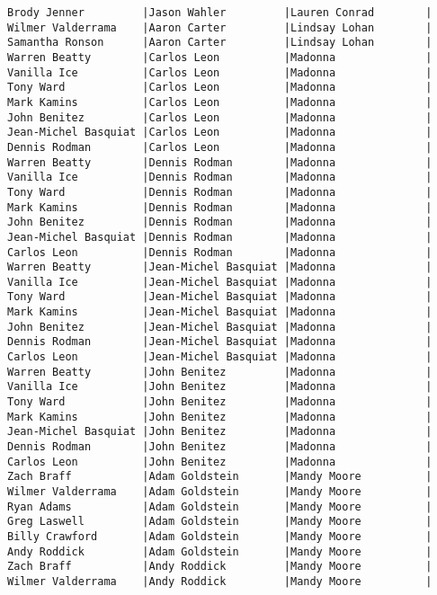 \documentclass{article}
\begin{document}
\begin{verbatim}
Brody Jenner         |Jason Wahler         |Lauren Conrad        |
Wilmer Valderrama    |Aaron Carter         |Lindsay Lohan        |
Samantha Ronson      |Aaron Carter         |Lindsay Lohan        |
Warren Beatty        |Carlos Leon          |Madonna              |
Vanilla Ice          |Carlos Leon          |Madonna              |
Tony Ward            |Carlos Leon          |Madonna              |
Mark Kamins          |Carlos Leon          |Madonna              |
John Benitez         |Carlos Leon          |Madonna              |
Jean-Michel Basquiat |Carlos Leon          |Madonna              |
Dennis Rodman        |Carlos Leon          |Madonna              |
Warren Beatty        |Dennis Rodman        |Madonna              |
Vanilla Ice          |Dennis Rodman        |Madonna              |
Tony Ward            |Dennis Rodman        |Madonna              |
Mark Kamins          |Dennis Rodman        |Madonna              |
John Benitez         |Dennis Rodman        |Madonna              |
Jean-Michel Basquiat |Dennis Rodman        |Madonna              |
Carlos Leon          |Dennis Rodman        |Madonna              |
Warren Beatty        |Jean-Michel Basquiat |Madonna              |
Vanilla Ice          |Jean-Michel Basquiat |Madonna              |
Tony Ward            |Jean-Michel Basquiat |Madonna              |
Mark Kamins          |Jean-Michel Basquiat |Madonna              |
John Benitez         |Jean-Michel Basquiat |Madonna              |
Dennis Rodman        |Jean-Michel Basquiat |Madonna              |
Carlos Leon          |Jean-Michel Basquiat |Madonna              |
Warren Beatty        |John Benitez         |Madonna              |
Vanilla Ice          |John Benitez         |Madonna              |
Tony Ward            |John Benitez         |Madonna              |
Mark Kamins          |John Benitez         |Madonna              |
Jean-Michel Basquiat |John Benitez         |Madonna              |
Dennis Rodman        |John Benitez         |Madonna              |
Carlos Leon          |John Benitez         |Madonna              |
Zach Braff           |Adam Goldstein       |Mandy Moore          |
Wilmer Valderrama    |Adam Goldstein       |Mandy Moore          |
Ryan Adams           |Adam Goldstein       |Mandy Moore          |
Greg Laswell         |Adam Goldstein       |Mandy Moore          |
Billy Crawford       |Adam Goldstein       |Mandy Moore          |
Andy Roddick         |Adam Goldstein       |Mandy Moore          |
Zach Braff           |Andy Roddick         |Mandy Moore          |
Wilmer Valderrama    |Andy Roddick         |Mandy Moore          |

\end{verbatim}
\end{document}
